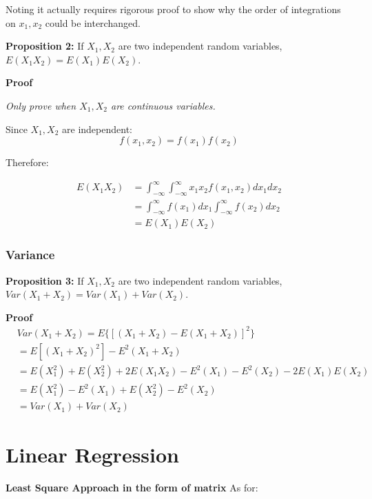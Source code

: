 \documentclass{article}
\begin{document}
Noting it actually requires rigorous proof to show why the order of
integrations on \(x_1, x_2\) could be interchanged.

\vspace{2mm}
\textbf{Proposition 2:} If \(X_1, X_2\) are two independent random variables,
\(E(X_1X_2)=E(X_1)E(X_2)\).

\vspace{2mm}
\textbf{Proof}

\textit{Only prove when \(X_1, X_2\) are continuous variables.}

Since \(X_1, X_2\) are independent:
\begin{equation}
    f(x_1, x_2)=f(x_1)f(x_2)
\end{equation}

Therefore:

\begin{equation}
\begin{split}
    E(X_1X_2)&=\int_{-\infty}^{\infty}\int_{-\infty}^{\infty}
    x_1x_2f(x_1, x_2)dx_1dx_2\\
    &=\int_{-\infty}^{\infty}f(x_1)dx_1\int_{-\infty}^{\infty}f(x_2)dx_2\\
    &=E(X_1)E(X_2)
\end{split}
\end{equation}

\subsubsection{Variance}

\vspace{2mm}
\textbf{Proposition 3:} If \(X_1, X_2\) are two independent random variables,
\(Var(X_1+X_2)=Var(X_1)+Var(X_2)\).

\vspace{2mm}
\textbf{Proof}
\begin{equation}
\begin{split}
    &Var(X_1+X_2)=E\{[(X_1+X_2)-E(X_1+X_2)]^2\}\\
    &=E[(X_1+X_2)^2]-E^2(X_1+X_2)\\
    &=E(X_1^2)+E(X_2^2)+2E(X_1X_2)-E^2(X_1)-E^2(X_2)-2E(X_1)E(X_2)\\
    &=E(X_1^2)-E^2(X_1)+E(X_2^2)-E^2(X_2)\\
    &=Var(X_1)+Var(X_2)
\end{split}
\end{equation}
\section{Linear Regression}
\textbf{Least Square Approach in the form of matrix}
As for:
\end{document}
